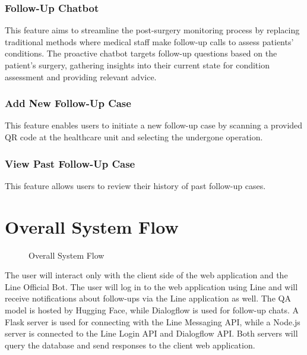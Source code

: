 \documentclass[12pt,oneside,openright,a4paper]{cpe-english-project}
\begin{document}
      \subsubsection{Follow-Up Chatbot}
      \qquad This feature aims to streamline the post-surgery monitoring process by replacing traditional methods where medical staff make follow-up calls to assess patients' conditions. The proactive chatbot targets follow-up questions based on the patient’s surgery, gathering insights into their current state for condition assessment and providing relevant advice. \par
      \subsubsection{Add New Follow-Up Case}
      \qquad This feature enables users to initiate a new follow-up case by scanning a provided QR code at the healthcare unit and selecting the undergone operation. \par
      \subsubsection{View Past Follow-Up Case}
      \qquad This feature allows users to review their history of past follow-up cases. 

  \section{Overall System Flow}
    \begin{figure}[!h]
      \centering
      \caption{Overall System Flow}\label{fig:Overall_System_Flow}
    \end{figure}
    \qquad The user will interact only with the client side of the web application and the Line Official Bot. The user will log in to the web application using Line and will receive notifications about follow-ups via the Line application as well. The QA model is hosted by Hugging Face, while Dialogflow is used for follow-up chats. A Flask server is used for connecting with the Line Messaging API, while a Node.js server is connected to the Line Login API and Dialogflow API. Both servers will query the database and send responses to the client web application.\par
\end{document}
